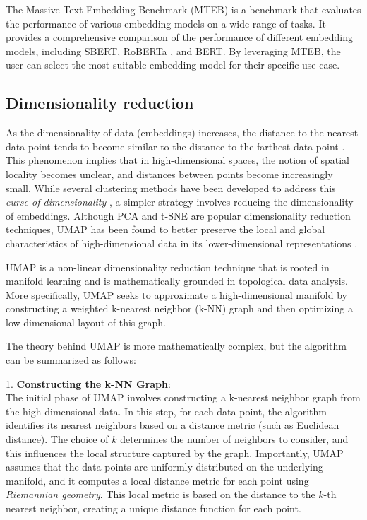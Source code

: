 The Massive Text Embedding Benchmark (MTEB) \cite{muennighoff_mteb_2023} is a benchmark that evaluates the performance of various embedding models on a wide range of tasks. It provides a comprehensive comparison of the performance of different embedding models, including SBERT, RoBERTa \cite{liu_roberta_2019}, and BERT. By leveraging MTEB, the user can select the most suitable embedding model for their specific use case.

\subsection{Dimensionality reduction}

As the dimensionality of data (embeddings) increases, the distance to the nearest data point tends to become similar to the distance to the farthest data point \cite{aggarwal_surprising_2001, beyer_when_1999}. This phenomenon implies that in high-dimensional spaces, the notion of spatial locality becomes unclear, and distances between points become increasingly small. While several clustering methods have been developed to address this \textit{curse of dimensionality} \cite{pandove_systematic_2018, steinbach_challenges_2004}, a simpler strategy involves reducing the dimensionality of embeddings. Although PCA \cite{abdi_principal_2010} and t-SNE \cite{van_der_maaten_visualizing_2008} are popular dimensionality reduction techniques, UMAP has been found to better preserve the local and global characteristics of high-dimensional data in its lower-dimensional representations \cite{mcinnes_umap_2020}.

UMAP is a non-linear dimensionality reduction technique that is rooted in manifold learning and is mathematically grounded in topological data analysis. More specifically, UMAP seeks to approximate a high-dimensional manifold by constructing a weighted k-nearest neighbor (k-NN) graph and then optimizing a low-dimensional layout of this graph.

The theory behind UMAP is more mathematically complex, but the algorithm can be summarized as follows:

1. \textbf{Constructing the k-NN Graph}:\\
The initial phase of UMAP involves constructing a k-nearest neighbor graph from the high-dimensional data. In this step, for each data point, the algorithm identifies its nearest neighbors based on a distance metric (such as Euclidean distance). The choice of $k$ determines the number of neighbors to consider, and this influences the local structure captured by the graph. Importantly, UMAP assumes that the data points are uniformly distributed on the underlying manifold, and it computes a local distance metric for each point using \textit{Riemannian geometry}. This local metric is based on the distance to the $k$-th nearest neighbor, creating a unique distance function for each point.

